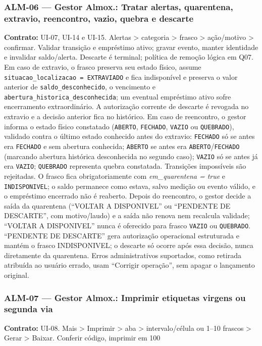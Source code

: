 \subsubsection{ALM-06 --- Gestor Almox.: Tratar alertas, quarentena, extravio, reencontro, vazio, quebra e descarte}
\textbf{Contrato:} UI-07, UI-14 e UI-15. Alertas > categoria > frasco > ação/motivo > confirmar. Validar transição e empréstimo ativo; gravar evento, manter identidade e invalidar saldo/alerta. Descarte é terminal; política de remoção lógica em Q07. Em caso de extravio, o frasco preserva seu estado físico, assume \texttt{situacao\_localizacao = EXTRAVIADO} e fica indisponível e preserva o valor anterior de \texttt{saldo\_desconhecido}, o vencimento e \texttt{abertura\_historica\_desconhecida}; um eventual empréstimo ativo sofre encerramento extraordinário. A autorização corrente de descarte é revogada no extravio e a decisão anterior fica no histórico. Em caso de reencontro, o gestor informa o estado físico constatado (\texttt{ABERTO}, \texttt{FECHADO}, \texttt{VAZIO} ou \texttt{QUEBRADO}), validado contra o último estado conhecido antes do extravio: \texttt{FECHADO} só se antes era \texttt{FECHADO} e sem abertura conhecida; \texttt{ABERTO} se antes era \texttt{ABERTO}/\texttt{FECHADO} (marcando abertura histórica desconhecida no segundo caso); \texttt{VAZIO} só se antes já era \texttt{VAZIO}; \texttt{QUEBRADO} representa quebra constatada. Transições impossíveis são rejeitadas. O frasco fica obrigatoriamente com \textit{em\_quarentena = true} e \texttt{INDISPONIVEL}; o saldo permanece como estava, salvo medição ou evento válido, e o empréstimo encerrado não é reaberto. Depois do reencontro, o gestor decide a saída da quarentena (``VOLTAR A DISPONIVEL'' ou ``PENDENTE DE DESCARTE'', com motivo/laudo) e a saída não renova nem recalcula validade; ``VOLTAR A DISPONIVEL'' nunca é oferecido para frasco \texttt{VAZIO} ou \texttt{QUEBRADO}. ``PENDENTE DE DESCARTE'' gera autorização operacional estruturada e mantém o frasco INDISPONIVEL; o descarte só ocorre após essa decisão, nunca diretamente da quarentena. Erros administrativos suportados, como retirada atribuída ao usuário errado, usam ``Corrigir operação'', sem apagar o lançamento original.

\subsubsection{ALM-07 --- Gestor Almox.: Imprimir etiquetas virgens ou segunda via}
\textbf{Contrato:} UI-08. Mais > Imprimir > aba > intervalo/célula ou 1--10 frascos > Gerar > Baixar. Conferir código, imprimir em 100%

